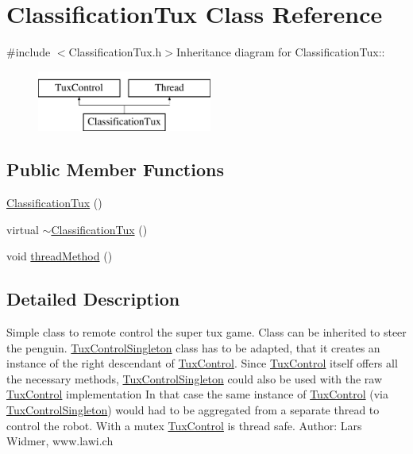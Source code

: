 \hypertarget{classClassificationTux}{
\section{ClassificationTux Class Reference}
\label{classClassificationTux}
}


{\ttfamily \#include $<$ClassificationTux.h$>$}Inheritance diagram for ClassificationTux::\begin{figure}[H]
\begin{center}
\leavevmode
\includegraphics[height=2cm]{classClassificationTux}
\end{center}
\end{figure}
\subsection*{Public Member Functions}
\begin{DoxyCompactItemize}
\item 
\hyperlink{classClassificationTux_ac15bcd174a9f3a53a90da07bcf14d29f}{ClassificationTux} ()
\item 
virtual \hyperlink{classClassificationTux_a782b740ccc0ff2726fe44564868dee47}{$\sim$ClassificationTux} ()
\item 
void \hyperlink{classClassificationTux_aa3824ae61c0d73ebff62c641793dc3ff}{threadMethod} ()
\end{DoxyCompactItemize}


\subsection{Detailed Description}
Simple class to remote control the super tux game. Class can be inherited to steer the penguin. \hyperlink{classTuxControlSingleton}{TuxControlSingleton} class has to be adapted, that it creates an instance of the right descendant of \hyperlink{classTuxControl}{TuxControl}. Since \hyperlink{classTuxControl}{TuxControl} itself offers all the necessary methods, \hyperlink{classTuxControlSingleton}{TuxControlSingleton} could also be used with the raw \hyperlink{classTuxControl}{TuxControl} implementation In that case the same instance of \hyperlink{classTuxControl}{TuxControl} (via \hyperlink{classTuxControlSingleton}{TuxControlSingleton}) would had to be aggregated from a separate thread to control the robot. With a mutex \hyperlink{classTuxControl}{TuxControl} is thread safe. Author: Lars Widmer, www.lawi.ch 

